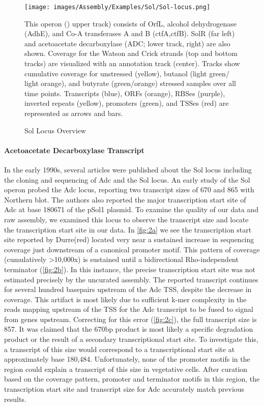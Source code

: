 \begin{figure}
\small
{\texttt{[image: images/Assembly/Examples/Sol/Sol-locus.png]}
\label{fig:1a}}
\caption{Sol Locus Overview} This operon () upper track) consists of OrfL, alcohol dehydrogenase (AdhE), and Co-A transferases A and B (ctfA,ctfB). SolR (far left) and acetoacetate decarboxylase (ADC;  lower track, right) are also shown. Coverage for the Watson and Crick strands (top and bottom tracks) are visualized with an annotation track (center). Tracks show cumulative coverage for unstressed (yellow), butanol (light green/ light orange), and butyrate (green/orange) stressed samples over all time points. Transcripts (blue), ORFs (orange), RBSes (purple), inverted repeats (yellow), promoters (green), and TSSes (red) are represented as arrows and bars.
\end{figure}

\paragraph{Acetoacetate Decarboxylase Transcript}
In the early 1990s, several articles were published about the Sol locus including the cloning and sequencing of Adc and the Sol locus\cite{62,63,64,65,66}. An early study of the Sol operon probed the Adc locus, reporting two transcript sizes of 670 and 865 with Northern blot\cite{65}. The authors also reported the major transcription start site of Adc at base 180671 of the pSol1 plasmid. To examine the quality of our data and raw assembly, we examined this locus to observe the transcript size and locate the transcription start site in our data. In \ref{fig:2a} we see the transcription start site reported by Durre(red) located very near a sustained increase in sequencing coverage just downstream of a canonical promoter motif. This pattern of coverage (cumulatively \textgreater 10,000x) is sustained until a bidirectional Rho-independent terminator (\ref{fig:2b}). In this instance, the precise transcription start site was not estimated precisely by the uncurated assembly. The reported transcript continues for several hundred basepairs upstream of the Adc TSS, despite the decrease in coverage. This artifact is most likely due to sufficient k-mer complexity in the reads mapping upstream of the TSS for the Adc transcript to be fused to signal from genes upstream. Correcting for this error (\ref{fig:2c}), the full transcript size is 857. It was claimed that the 670bp product is most likely a specific degradation product or the result of a secondary transcriptional start site\cite{65}. To investigate this, a transcript of this size would correspond to a transcriptional start site at approximately base 180,484. Unfortunately, none of the promoter motifs in the region could explain a transcript of this size in vegetative cells. After curation based on the coverage pattern, promoter and terminator motifs in this region, the transcription start site and transcript size for Adc accurately match previous results. 


